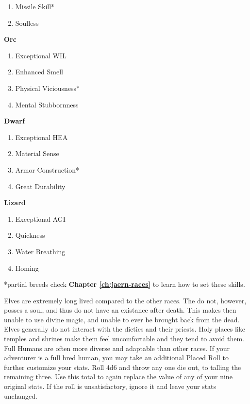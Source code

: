 \begin{multicols*}{2}
\begin{multicols}{2}
\begin{tcolorbox}[breakable,boxrule=0pt,after skip=0pt]
\begin{enumerate}[leftmargin=0.1cm]
\item Missile Skill*
\item Soulless
\end{enumerate}
\end{tcolorbox}
\begin{tcolorbox}[breakable,boxrule=0pt,after skip=0pt]
\textbf{Orc}
\begin{enumerate}[leftmargin=0.1cm]
\item Exceptional WIL
\item Enhanced Smell
\item Physical Viciousness*
\item Mental Stubbornness
\end{enumerate}
\end{tcolorbox}
\begin{tcolorbox}[breakable,boxrule=0pt,after skip=0pt]
\textbf{Dwarf}
\begin{enumerate}[leftmargin=0.1cm]
\item Exceptional HEA
\item Material Sense
\item Armor Construction*
\item Great Durability
\end{enumerate}
\end{tcolorbox}
\begin{tcolorbox}[breakable,boxrule=0pt,after skip=0pt]
\textbf{Lizard}
\begin{enumerate}[leftmargin=0.1cm]
\item Exceptional AGI
\item Quickness
\item Water Breathing
\item Homing
\end{enumerate}
\end{tcolorbox}
\end{multicols}

*partial breeds check \textbf{Chapter \ref{ch:jaern-races}} to learn how to set these skills.

Elves are extremely long lived compared to the other races. The do not, however, posses a soul, and thus do not have an existance after death. This makes then unable to use divine magic, and unable to ever be brought back from the dead. Elves generally do not interact with the dieties and their priests. Holy places like temples and shrines make them feel uncomfortable and they tend to avoid them.\\
Full Humans are often more diverse and adaptable than other races. If your adventurer is a full bred human, you may take an additional Placed Roll to further customize your stats. Roll 4d6 and throw any one die out, to talling the remaining three. Use this total to again replace the value of any of your nine original stats. If the roll is unsatisfactory, ignore it and leave your stats unchanged.

\end{multicols*}
